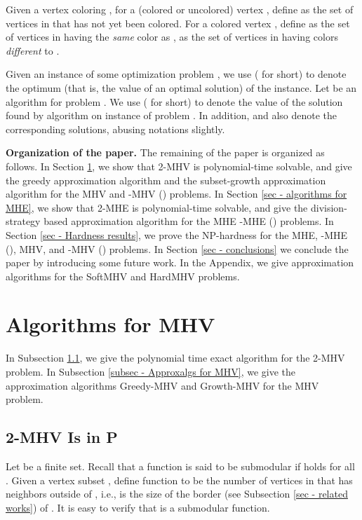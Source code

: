 \documentclass[11pt]{article}
\begin{document}
Given a vertex coloring , for a (colored or uncolored) vertex , define
 as the set of vertices in  that has not yet been colored.
For a colored vertex , define  as the set of vertices in 
having the {\em same} color as ,  as the set of vertices in
 having colors {\em different} to .

Given an instance  of some optimization problem ,
we use  ( for short) to denote the optimum (that is,
the value of an optimal solution) of the instance.
Let  be an algorithm for problem .
We use  ( for short) to denote the value of the solution
found by algorithm  on instance  of problem .
In addition,  and  also denote the corresponding solutions,
abusing notations slightly.




\bigskip
{\bf Organization of the paper.}
The remaining of the paper is organized as follows.
In Section \ref{sec - algorithms for MHV}, we show that 2-MHV is
polynomial-time solvable, and give the greedy approximation algorithm
and the subset-growth approximation algorithm for the MHV and -MHV
() problems.
In Section \ref{sec - algorithms for MHE}, we show that 2-MHE is
polynomial-time solvable, and give the division-strategy based approximation
algorithm for the MHE -MHE () problems.
In Section \ref{sec - Hardness results}, we prove the NP-hardness for the MHE,
-MHE (), MHV, and -MHV () problems.
In Section \ref{sec - conclusions} we conclude the paper by
introducing some future work. In the Appendix, we give approximation
algorithms for the SoftMHV and HardMHV problems.




\section{Algorithms for MHV}
\label{sec - algorithms for MHV}
In Subsection \ref{subsec - 2-MHV Is in P}, we give the polynomial time exact
algorithm for the 2-MHV problem. In Subsection \ref{subsec - Approxalgs for MHV},
we give the approximation algorithms {\sc Greedy-MHV} and {\sc Growth-MHV} for
the MHV problem.




\subsection{2-MHV Is in P}
\label{subsec - 2-MHV Is in P}
Let  be a finite set. Recall that a function
 is said to be submodular if
 holds for all .
Given a vertex subset , define function  to be
the number of vertices in  that has neighbors outside of , i.e.,
 is the size of the border (see Subsection \ref{sec - related works})
of . It is easy to verify that  is a submodular function.
\end{document}
